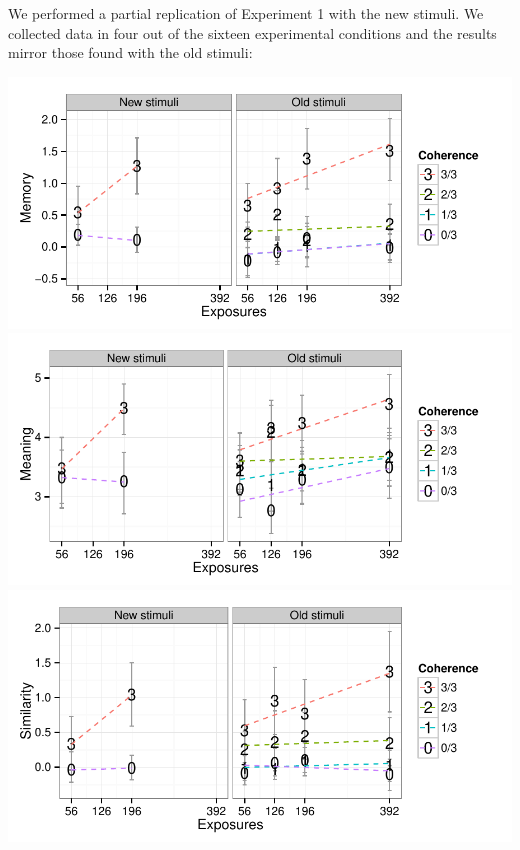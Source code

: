 \documentclass[man,floatsintext]{apa6}
\begin{document}
We performed a partial replication of Experiment 1 with the new stimuli. We collected data in four out of the sixteen experimental conditions and the results mirror those found with the old stimuli:

\begin{center}
\includegraphics[width=0.7\linewidth]{stim-comparison-mem} \\

\includegraphics[width=0.7\linewidth]{stim-comparison-mng} \\

\includegraphics[width=0.7\linewidth]{stim-comparison-sim}
\end{center}
\end{document}
